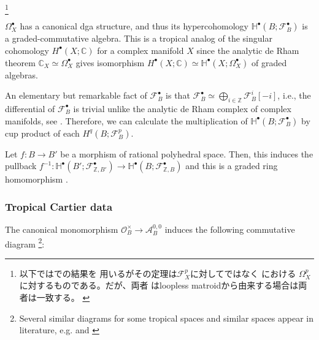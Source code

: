 \documentclass[a4paper,dvipdfmx,reqno,12pt]{amsart}
\theoremstyle{definition}
\newcommand{\C}{\mathbb{C}}%
\newcommand{\Z}{\mathbb{Z}}%
\newcommand{\mb}[1]{\mathbb{#1}}%
\newcommand{\mcal}[1]{\mathcal{#1}}%
\numberwithin{equation}{section}
\begin{document}
\footnote{以下では\cite{gross2019sheaftheoretic}での結果を
用いるがその定理は$\mcal{F}_X^{p}$に対してではなく
\cite{gross2019sheaftheoretic}における
$\Omega_X^{p}$に対するものである。だが、両者
はloopless matroidから由来する場合は両者は一致する。
\cite[Remark 2.8]{gross2019sheaftheoretic}}

$\Omega_X^{\bullet}$ has a canonical dga structure, 
and thus its hypercohomology 
$\mb{H}^{\bullet}(B;\mcal{F}_{B}^{\bullet})$ is a 
graded-commutative algebra. 
This is a tropical analog of the singular cohomology
$H^{\bullet}(X;\C)$ for a complex manifold $X$ since 
the analytic de Rham theorem $\C_X \simeq \Omega_X^{\bullet}$ 
gives isomorphism 
$H^{\bullet}(X;\C)\simeq \mb{H}^{\bullet}(X;\Omega_X^{\bullet})$
of graded algebras. 

An elementary but remarkable fact of 
$\mcal{F}_{B}^{\bullet}$ is that $\mcal{F}_{B}^{\bullet}\simeq 
\bigoplus_{i\in \Z}\mcal{F}_B^{i}[-i]$, i.e., the differential 
of $\mcal{F}_{B}^{\bullet}$ is trivial unlike the analytic de Rham complex
of complex manifolds, see \cite[Corollary 2.15]{epub36262}.
Therefore, we can calculate the multiplication of 
$\mb{H}^{\bullet}(B;\mcal{F}_B^{\bullet})$ by 
cup product of each $H^{q}(B;\mcal{F}_B^{p})$.

Let $f\colon B\to B'$ be a morphism of rational polyhedral 
space. Then, this induces the pullback $f^{-1}\colon 
\mb{H}^{\bullet}(B';\mcal{F}_{\Z, B'}^{\bullet})\to 
\mb{H}^{\bullet}(B;\mcal{F}_{\Z, B}^{\bullet})$
and this is a graded ring homomorphism \cite[Proposition 4.17]{gross2019sheaftheoretic}. 
\subsubsection{Tropical Cartier data}

The canonical monomorphism $\mcal{O}^{\times}_B \to \mcal{A}^{0,0}_B$
induces the following commutative diagram 
\footnote{Several similar diagrams for some tropical spaces and 
similar spaces appear
  in literature, e.g. \cite[p.468]{aspinwallDirichletBranesMirror2009}
 and \cite[Definition 1.45]{grossMirrorSymmetryLogarithmic2006a}}:
\end{document}
